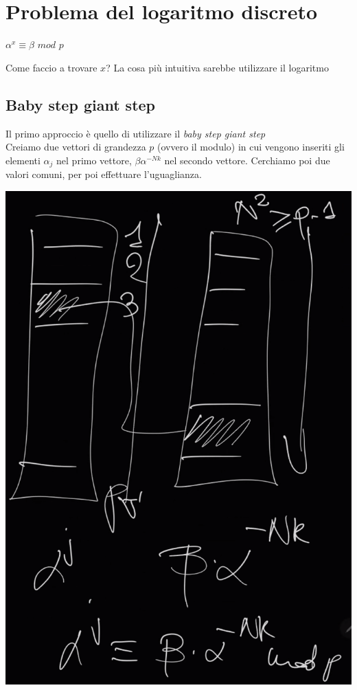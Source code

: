 \documentclass[11pt, oneside]{article}   	%
\begin{document}
\section*{Problema del logaritmo discreto}

\begin{center}
$\alpha^x \equiv \beta$ $mod$ $p$
\end{center}
Come faccio a trovare $x$? La cosa più intuitiva sarebbe utilizzare il logaritmo
\subsection*{Baby step giant step}
Il primo approccio è quello di utilizzare il \emph{baby step giant step}\\
Creiamo due vettori di grandezza $p$ (ovvero il modulo) in cui vengono inseriti gli elementi $\alpha_j$ nel primo vettore, $\beta\alpha^{-Nk}$ nel secondo vettore. Cerchiamo poi due valori comuni, per poi effettuare l'uguaglianza. 
\begin{center}
\includegraphics[scale= 0.7]{rev1}
\end{center}
\end{document}
